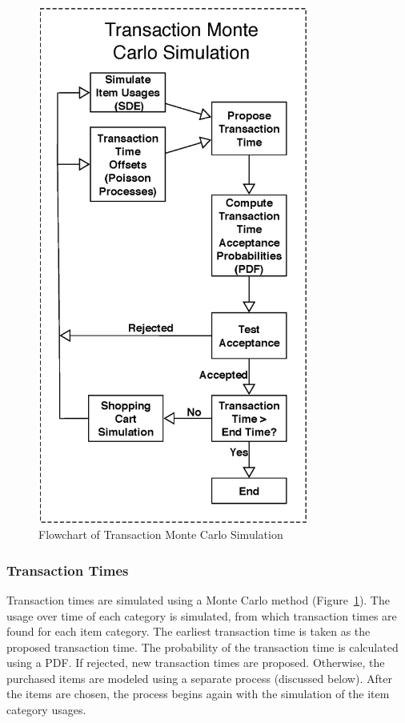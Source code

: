 \documentclass[conference]{IEEEtran}
\begin{document}
\begin{figure}[!t]
  \centering
  \includegraphics[width=3.5in]{figures/transaction_simulation.eps}
  \caption{Flowchart of Transaction Monte Carlo Simulation}
  \label{fig:trans_sim}
\end{figure}

\subsubsection{Transaction Times} \label{sec:transaction-times}

Transaction times are simulated using a Monte Carlo method (Figure~\ref{fig:trans_sim}).  The usage over time of each category is simulated, from which transaction times are found for each item category. The earliest transaction time is taken as the proposed transaction time.  The probability of the transaction time is calculated using a PDF.  If rejected, new transaction times are proposed.  Otherwise, the purchased items are modeled using a separate process (discussed below). After the items are chosen, the process begins again with the simulation of the item category usages.
\end{document}
